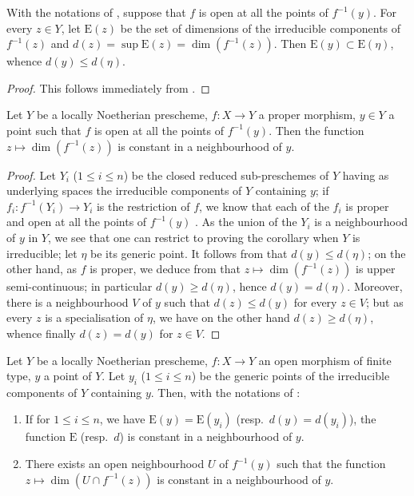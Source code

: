 \begin{corollary}[14.2.4]
\label{IV.14.2.4}
With the notations of , suppose that $f$ is open at all the points of $f^{-1}(y)$.
For every $z\in Y$, let $\mathrm{E}(z)$ be the set of dimensions of the irreducible components of $f^{-1}(z)$ and $d(z)=\sup\mathrm{E}(z)=\dim(f^{-1}(z))$.
Then $\mathrm{E}(y)\subset\mathrm{E}(\eta)$, whence $d(y)\leq d(\eta)$.
\end{corollary}

\begin{proof}
This follows immediately from .
\end{proof}

\begin{corollary}[14.2.5]
\label{IV.14.2.5}
Let $Y$ be a locally Noetherian prescheme, $f:X\to Y$ a proper morphism, $y\in Y$ a point such that $f$ is open at all the points of $f^{-1}(y)$.
Then the function $z\mapsto\dim(f^{-1}(z))$ is constant in a neighbourhood of $y$.
\end{corollary}

\begin{proof}
Let $Y_i$ ($1\leq i\leq n$) be the closed reduced sub-preschemes of $Y$ having as underlying spaces the irreducible components of $Y$ containing $y$; if $f_i:f^{-1}(Y_i)\to Y_i$ is the restriction of $f$, we know that each of the $f_i$ is proper  and open at all the points of $f^{-1}(y)$ .
As the union of the $Y_i$ is a neighbourhood of $y$ in $Y$,
we see that one can restrict to proving the corollary when $Y$ is irreducible; let $\eta$ be its generic point.
It follows from  that $d(y)\leq d(\eta)$; on the other hand, as $f$ is proper, we deduce from  that $z\mapsto\dim(f^{-1}(z))$ is upper semi-continuous; in particular $d(y)\geq d(\eta)$, hence $d(y)=d(\eta)$.
Moreover, there is a neighbourhood $V$ of $y$ such that $d(z)\leq d(y)$ for every $z\in V$; but as every $z$ is a specialisation of $\eta$, we have on the other hand $d(z)\geq d(\eta)$, whence finally $d(z)=d(y)$ for $z\in V$.
\end{proof}

\begin{corollary}[14.2.6]
\label{IV.14.2.6}
Let $Y$ be a locally Noetherian prescheme, $f:X\to Y$ an open morphism of finite type, $y$ a point of $Y$.
Let $y_i$ ($1\leq i\leq n$) be the generic points of the irreducible components of $Y$ containing $y$.
Then, with the notations of :
\begin{enumerate}[label=(\roman*)]
  \item If for $1\leq i\leq n$, we have $\mathrm{E}(y)=\mathrm{E}(y_i)$ (resp.\ $d(y)=d(y_i)$), the function $\mathrm{E}$ (resp.\ $d$) is constant in a neighbourhood of $y$.
  \item There exists an open neighbourhood $U$ of $f^{-1}(y)$ such that the function $z\mapsto\dim(U\cap f^{-1}(z))$ is constant in a neighbourhood of $y$.
\end{enumerate}
\end{corollary}

